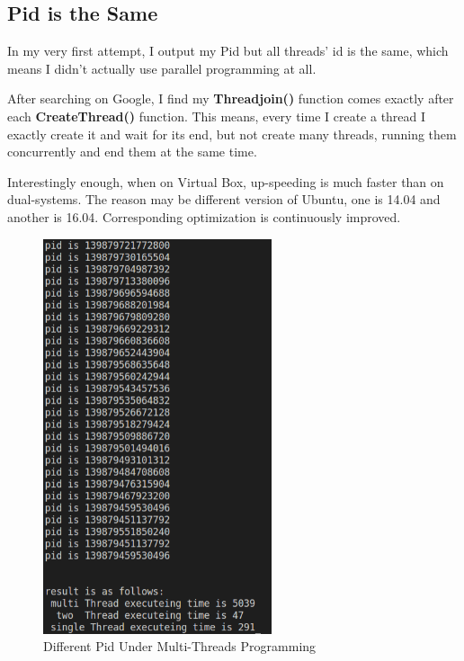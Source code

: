 \documentclass[12pt,a4paper]{article}
\begin{document}
\subsection{Pid is the Same}\label{Part:Pid is the same}
\begin{minipage}{0.5\textwidth}
	In my very first attempt, I output my Pid but all threads' id is the same, which means I didn't actually use parallel programming at all.

	\quad After searching on Google, I find my \textbf{Threadjoin()} function comes exactly after each \textbf{CreateThread()} function. This means, every time I create a thread I exactly create it and wait for its end, but not create many threads, running them concurrently and end them at the same time.

	\quad Interestingly enough, when on Virtual Box, up-speeding is much faster than on dual-systems. The reason may be different version of Ubuntu, one is 14.04 and another is 16.04. Corresponding optimization is continuously improved.
\end{minipage}
\begin{minipage}{0.5\textwidth}
	\begin{figure}[H]
		\centering
		\includegraphics[width= 0.6\textwidth]{./fig/pid.png}
		\caption{Different Pid Under Multi-Threads Programming}
		\label{fig::pid}
	\end{figure}
\end{minipage}
\end{document}
